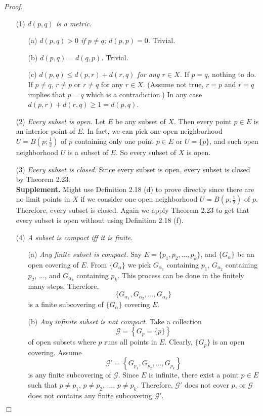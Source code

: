 \documentclass{article}
\begin{document}
\emph{Proof.}
\begin{enumerate}
\item[(1)] \emph{$d(p, q)$ is a metric.}
\begin{enumerate}
\item[(a)] \emph{$d(p, q) > 0$ if $p \neq q$; $d(p, p) = 0$.} Trivial.
\item[(b)] \emph{$d(p, q) = d(q, p)$.} Trivial.
\item[(c)] \emph{$d(p, q) \leq d(p, r) + d(r, q)$ for any $r \in X$.}
If $p = q$, nothing to do. If $p \neq q$, $r \neq p$ or $r \neq q$ for any $r \in X$.
(Assume not true, $r = p$ and $r = q$ implies that $p = q$ which is a contradiction.)
In any case $d(p, r) + d(r, q) \geq 1 = d(p, q)$.
\end{enumerate}
\item[(2)] \emph{Every subset is open.}
Let $E$ be any subset of $X$.
Then every point $p \in E$ is an interior point of $E$.
In fact, we can pick one open neighborhood $U = B\left(p;\frac{1}{2}\right)$ of $p$
containing only one point $p \in E$ or $U = \{ p \}$,
and such open neighborhood $U$ is a subset of $E$.
So every subset of $X$ is open.
\item[(3)] \emph{Every subset is closed.}
Since every subset is open, every subset is closed by Theorem 2.23. \\

\textbf{Supplement.}
Might use Definition 2.18 (d) to prove directly since there are no limit points in $X$
if we consider one open neighborhood $U = B\left(p;\frac{1}{2}\right)$ of $p$.
Therefore, every subset is closed.
Again we apply Theorem 2.23 to get that every subset is open
without using Definition 2.18 (f).
\item[(4)] \emph{A subset is compact iff it is finite.}
\begin{enumerate}
\item[(a)]
\emph{Any finite subset is compact.}
Say $E = \{p_1, p_2, ..., p_k\}$, and $\{ G_{\alpha} \}$ be an open covering of $E$.
From $\{ G_{\alpha} \}$
we pick
$G_{\alpha_1}$ containing $p_1$,
$G_{\alpha_2}$ containing $p_2$, ..., and
$G_{\alpha_k}$ containing $p_k$.
This process can be done in the finitely many steps.
Therefore,
$$\{ G_{\alpha_1}, G_{\alpha_2}, ..., G_{\alpha_k} \}$$
is a finite subcovering of $\{ G_{\alpha} \}$ covering $E$.
\item[(b)]
\emph{Any infinite subset is not compact.}
Take a collection
$$\mathscr{G} = \left\{ G_p = \{ p \} \right\}$$
of open subsets where $p$ runs all points in $E$.
Clearly, $\{ G_p \}$ is an open covering.
Assume
$$\mathscr{G}' = \left\{ G_{p_1}, G_{p_2}, ..., G_{p_k} \right\}$$
is any finite subcovering of $\mathscr{G}$.
Since $E$ is infinite, there exist a point $p \in E$ such that
$p \neq p_1$,
$p \neq p_2$, ...,
$p \neq p_k$.
Therefore, $\mathscr{G}'$ does not cover $p$,
or $\mathscr{G}$ does not contains any finite subcovering $\mathscr{G}'$.
\end{enumerate}
\end{enumerate}
$\Box$ \\
\end{document}
